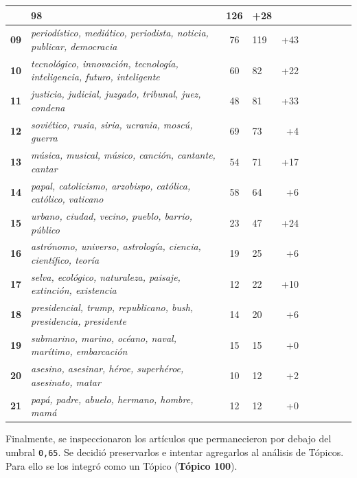 \documentclass[
]{article}
\newcounter{none} %
\begin{document}
{\begin{longtable}[]
{vacunación} & 98 & 126 & +28\\ \midrule
\textbf{09} & \emph{periodístico, mediático, periodista, noticia,
publicar, democracia} & 76 & 119 & +43\\ \midrule
\textbf{10} & \emph{tecnológico, innovación, tecnología, inteligencia,
futuro, inteligente} & 60 & 82 & +22\\ \midrule
\textbf{11} & \emph{justicia, judicial, juzgado, tribunal, juez,
condena} & 48 & 81 & +33\\ \midrule
\textbf{12} & \emph{soviético, rusia, siria, ucrania, moscú, guerra} &
69 & 73 & +4\\ \midrule
\textbf{13} & \emph{música, musical, músico, canción, cantante, cantar}
& 54 & 71 & +17\\ \midrule
\textbf{14} & \emph{papal, catolicismo, arzobispo, católica, católico,
vaticano} & 58 & 64 & +6\\ \midrule
\textbf{15} & \emph{urbano, ciudad, vecino, pueblo, barrio, público} &
23 & 47 & +24\\ \midrule
\textbf{16} & \emph{astrónomo, universo, astrología, ciencia,
científico, teoría} & 19 & 25 & +6\\ \midrule
\textbf{17} & \emph{selva, ecológico, naturaleza, paisaje, extinción,
existencia} & 12 & 22 & +10\\ \midrule
\textbf{18} & \emph{presidencial, trump, republicano, bush, presidencia,
presidente} & 14 & 20 & +6\\ \midrule
\textbf{19} & \emph{submarino, marino, océano, naval, marítimo,
embarcación} & 15 & 15 & +0\\ \midrule
\textbf{20} & \emph{asesino, asesinar, héroe, superhéroe, asesinato,
matar} & 10 & 12 & +2\\ \midrule
\textbf{21} & \emph{papá, padre, abuelo, hermano, hombre, mamá} & 12 &
12 & +0\\ \midrule
\end{longtable}
}

Finalmente, se inspeccionaron los artículos que permanecieron por debajo
del umbral \texttt{0,65}. Se decidió preservarlos e intentar agregarlos
al análisis de Tópicos. Para ello se los integró como un Tópico
(\textbf{Tópico 100}).

\end{document}
